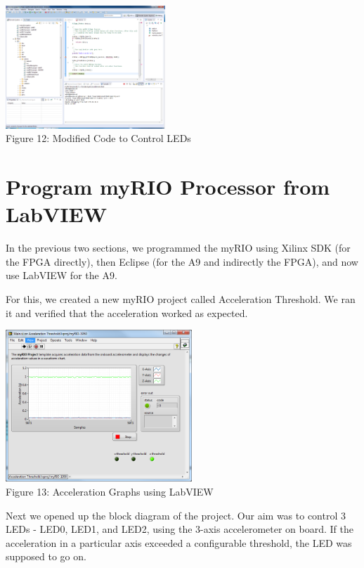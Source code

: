 \documentclass[twoside]{article}
\begin{document}
\begin{multicols}{2}
\begin{center}
\includegraphics*[width = 6cm]{Fig12.png}\\
Figure 12: Modified Code to Control LEDs
\end{center}


\section{Program myRIO Processor from LabVIEW}

In the previous two sections, we programmed the myRIO using Xilinx SDK (for the FPGA directly), then Eclipse (for the A9 and indirectly the FPGA), and now use LabVIEW for the A9.

For this, we created a new myRIO project called Acceleration Threshold. We ran it and verified that the acceleration worked as expected.

\begin{center}
\includegraphics*[width = 7cm]{FIG13.png}\\
Figure 13: Acceleration Graphs using LabVIEW
\end{center}

Next we opened up the block diagram of the project. Our aim was to control 3 LEDs - LED0, LED1, and LED2, using the 3-axis accelerometer on board. If the acceleration in a particular axis exceeded a configurable threshold, the LED was supposed to go on. 


\end{multicols}
\end{document}
